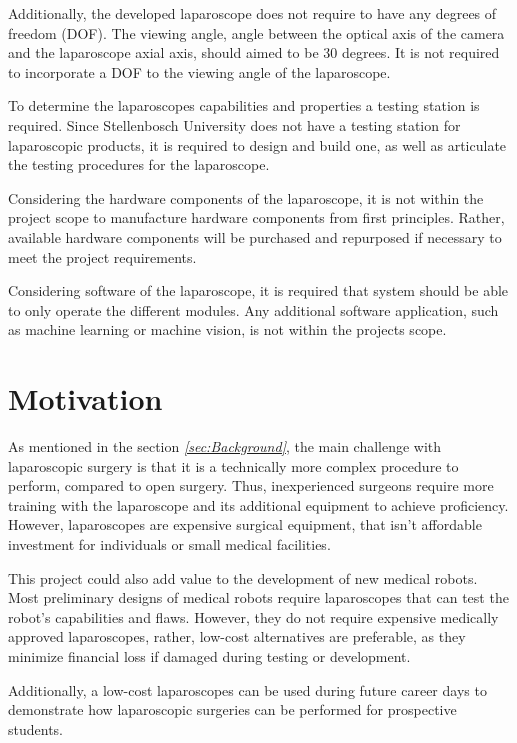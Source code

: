 Additionally, the developed laparoscope does not require to have any degrees of freedom (DOF). The viewing angle, angle between the optical axis of the camera and the laparoscope axial axis, should aimed to be 30 degrees. It is not required to incorporate a DOF to the viewing angle of the laparoscope.

To determine the laparoscopes capabilities and properties a testing station is required. Since Stellenbosch University does not have a testing station for laparoscopic products, it is required to design and build one, as well as articulate the testing procedures for the laparoscope. 

Considering the hardware components of the laparoscope, it is not within the project scope to manufacture hardware components from first principles. Rather, available hardware components will be purchased and repurposed if necessary to meet the project requirements. 

Considering software of the laparoscope, it is required that system should be able to only operate the different modules. Any additional software application, such as machine learning or machine vision, is not within the projects scope. 



\section{Motivation}

As mentioned in the section \textit{\ref{sec:Background}}, the main challenge with laparoscopic surgery is that it is a technically more complex procedure to perform, compared to open surgery. Thus, inexperienced surgeons require more training with the laparoscope and its additional equipment to achieve proficiency. However, laparoscopes are expensive surgical equipment, that isn't affordable investment for individuals or small medical facilities.


This project could also add value to the development of new medical robots. Most preliminary designs of medical robots require laparoscopes that can test the robot's capabilities and flaws. However, they do not require expensive medically approved laparoscopes, rather, low-cost alternatives are preferable, as they minimize financial loss if damaged during testing or development. 

Additionally, a low-cost laparoscopes can be used during future career days to demonstrate how laparoscopic surgeries can be performed for prospective students. 



